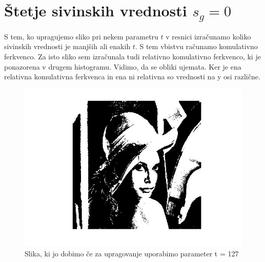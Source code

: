 \documentclass[12pt,a4paper]{article}
\begin{document}
\section{Štetje sivinskih vrednosti $s_g = 0$}
S tem, ko upragujemo sliko pri nekem parametru $t$ v resnici izračunamo koliko sivinskih vrednosti je manjših ali enakih $t$. S tem vbistvu računamo komulativno ferkvenco. Za isto sliko sem izračunala tudi relativno komulativno ferkvenco, ki je ponazorena v drugem histogramu. Vidimo, da se obliki ujemata. Ker je ena relativna komulativna ferkvenca in ena ni relativna so vrednosti na y osi različne.
\pagebreak
\begin{figure}[h!]
  \begin{center}
    \includegraphics[scale = 0.7]{prag.jpg}
    \caption{Slika, ki jo dobimo če za upragovanje uporabimo parameter t = 127}
    \label{fig:}
  \end{center}
\end{figure}
\end{document}
